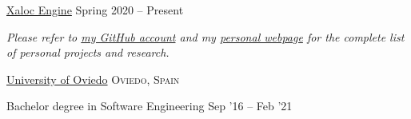 \documentclass[10pt,a4paper]{article} %
\begin{document}

{

\headedsubsection %
{\href{https://github.com/pacojq/Xaloc}{Xaloc Engine}}
{Spring 2020 -- Present}
{}



}


\begin{center}
\textit{Please refer to \href{https://github.com/pacojq}{my GitHub account} and my \href{http://pacojq.github.io}{personal webpage} for the complete list of personal projects and research.}
\end{center}


\spacedhrule{-0.2em}{-0.4em} %




\headedsection %
{\href{http://www.uniovi.es/en/inicio}{University of Oviedo}}
{\textsc{Oviedo, Spain}} {

\headedsubsection %
{Bachelor degree in Software Engineering}
{Sep '16 -- Feb '21}
{}

}

\spacedhrule{0.5em}{-0.4em} %

\end{document}
